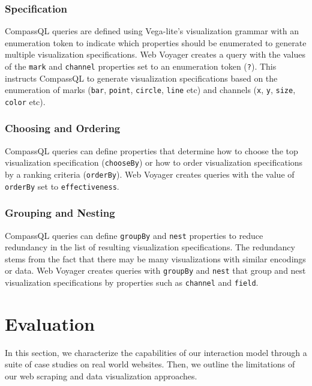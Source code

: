 \documentclass{vgtc}                          %
\begin{document}
\subsubsection{Specification}

CompassQL queries are defined using Vega-lite's visualization grammar
with an enumeration token to indicate which properties should be
enumerated to generate multiple visualization specifications. Web
Voyager creates a query with the values of the \texttt{mark} and
\texttt{channel} properties set to an enumeration token (\texttt{?}).
This instructs CompassQL to generate visualization specifications based
on the enumeration of marks (\texttt{bar}, \texttt{point},
\texttt{circle}, \texttt{line} etc) and channels (\texttt{x},
\texttt{y}, \texttt{size}, \texttt{color} etc).

\subsubsection{Choosing and Ordering}

CompassQL queries can define properties that determine how to choose the
top visualization specification (\texttt{chooseBy}) or how to order
visualization specifications by a ranking criteria (\texttt{orderBy}).
Web Voyager creates queries with the value of \texttt{orderBy} set to
\texttt{effectiveness}.

\subsubsection{Grouping and Nesting}

CompassQL queries can define \texttt{groupBy} and \texttt{nest}
properties to reduce redundancy in the list of resulting visualization
specifications. The redundancy stems from the fact that there may be
many visualizations with similar encodings or data. Web Voyager creates
queries with \texttt{groupBy} and \texttt{nest} that group and nest
visualization specifications by properties such as \texttt{channel} and
\texttt{field}.

\section{Evaluation} \label{evaluation}

In this section, we characterize the capabilities of our interaction
model through a suite of case studies on real world websites. Then, we
outline the limitations of our web scraping and data visualization
approaches.
\end{document}
